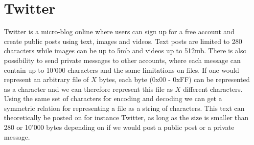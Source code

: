 \section{Twitter}
Twitter is a micro-blog online where users can sign up for a free account and create public posts using text, images and videos. Text posts are limited to 280 characters while images can be up to 5mb and videos up to 512mb\cite{MediaBestPractices}. There is also possibility to send private messages to other accounts, where each message can contain up to 10'000 characters and the same limitations on files. If one would represent an arbitrary file of $X$ bytes, each byte (0x00 - 0xFF) can be represented as a character and we can therefore represent this file as $X$ different characters. Using the same set of characters for encoding and decoding we can get a symmetric relation for representing a file as a string of characters. This text can theoretically be posted on for instance Twitter, as long as the size is smaller than 280 or 10'000 bytes depending on if we would post a public post or a private message.